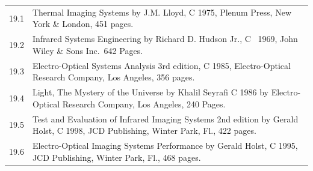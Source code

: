 \documentclass[
]{book}
\begin{document}
\begin{longtable}[]{@{}ll@{}}
\toprule
\endhead
\begin{minipage}[t]{0.06\columnwidth}\raggedright
19.1\strut
\end{minipage} & \begin{minipage}[t]{0.88\columnwidth}\raggedright
Thermal Imaging Systems by J.M. Lloyd, C 1975, Plenum Press, New York \& London, 451 pages.\strut
\end{minipage}\tabularnewline
\begin{minipage}[t]{0.06\columnwidth}\raggedright
19.2\strut
\end{minipage} & \begin{minipage}[t]{0.88\columnwidth}\raggedright
Infrared Systems Engineering by Richard D. Hudson Jr., C~ 1969, John Wiley \& Sons Inc.~642 Pages.\strut
\end{minipage}\tabularnewline
\begin{minipage}[t]{0.06\columnwidth}\raggedright
19.3\strut
\end{minipage} & \begin{minipage}[t]{0.88\columnwidth}\raggedright
Electro-Optical Systems Analysis 3rd edition, C 1985, Electro-Optical Research Company, Los Angeles, 356 pages.\strut
\end{minipage}\tabularnewline
\begin{minipage}[t]{0.06\columnwidth}\raggedright
19.4\strut
\end{minipage} & \begin{minipage}[t]{0.88\columnwidth}\raggedright
Light, The Mystery of the Universe by Khalil Seyrafi C 1986 by Electro-Optical Research Company, Los Angeles, 240 Pages.\strut
\end{minipage}\tabularnewline
\begin{minipage}[t]{0.06\columnwidth}\raggedright
19.5\strut
\end{minipage} & \begin{minipage}[t]{0.88\columnwidth}\raggedright
Test and Evaluation of Infrared Imaging Systems 2nd edition by Gerald Holst, C 1998, JCD Publishing, Winter Park, Fl., 422 pages.\strut
\end{minipage}\tabularnewline
\begin{minipage}[t]{0.06\columnwidth}\raggedright
19.6\strut
\end{minipage} & \begin{minipage}[t]{0.88\columnwidth}\raggedright
Electro-Optical Imaging Systems Performance by Gerald Holst, C 1995, JCD Publishing, Winter Park, Fl., 468 pages.\strut

\end{minipage}
\end{longtable}
\end{document}
